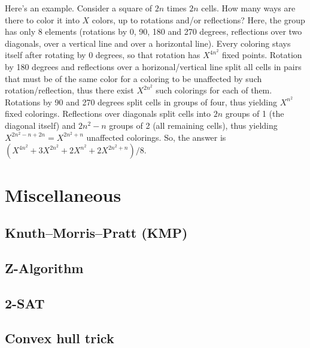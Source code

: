 \documentclass[9pt]{extarticle}
\begin{document}
\begin{multicols*}{3}
Here's an example. Consider a square of $2n$ times $2n$ cells. How many ways
are there to color it into $X$ colors, up to rotations and/or reflections?
Here, the group has only 8 elements (rotations by 0, 90, 180 and 270 degrees,
reflections over two diagonals, over a vertical line and over a horizontal
line). Every coloring stays itself after rotating by 0 degrees, so that
rotation has $X^{4n^2}$ fixed points. Rotation by 180 degrees and reflections
over a horizonal/vertical line split all cells in pairs that must be of the
same color for a coloring to be unaffected by such rotation/reflection, thus
there exist $X^{2n^2}$ such colorings for each of them. Rotations by 90 and 270
degrees split cells in groups of four, thus yielding $X^{n^2}$ fixed colorings.
Reflections over diagonals split cells into $2n$ groups of 1 (the diagonal
itself) and $2n^2-n$ groups of 2 (all remaining cells), thus yielding
$X^{2n^2-n+2n}=X^{2n^2+n}$ unaffected colorings.  So, the answer is
$(X^{4n^2}+3X^{2n^2}+2X^{n^2}+2X^{2n^2+n})/8$.

\section{Miscellaneous}

\subsection{Knuth--Morris--Pratt (KMP)} %


\subsection{Z-Algorithm}


\subsection{2-SAT} %


\subsection{Convex hull trick} %



\end{multicols*}
\end{document}
